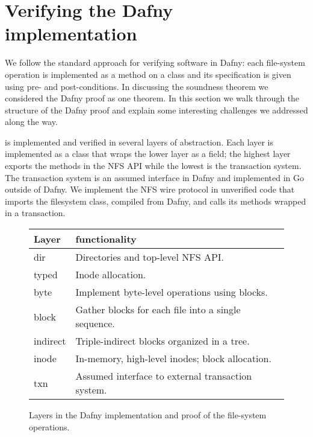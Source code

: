 \section{Verifying the Dafny implementation}%
\label{sec:design}

We follow the standard approach for verifying software in Dafny: each
file-system operation is implemented as a method on a class and its
specification is given using pre- and post-conditions. In discussing the
soundness theorem we considered the Dafny proof as one theorem. In this
section we walk through the structure of the Dafny proof and explain some interesting
challenges we addressed along the way.


\sys is implemented and verified in several layers of abstraction. Each layer is
implemented as a class that wraps the lower layer as a field; the highest layer
exports the methods in the NFS API while the lowest is the transaction system.
The transaction system is an assumed interface in Dafny and implemented in Go
outside of Dafny. We implement the NFS wire protocol in unverified code that
imports the filesystem class, compiled from Dafny, and calls its methods wrapped
in a transaction.


\begin{figure}
  \centering
\begin{tabular}{ll}
  \toprule
  \textbf{Layer} & \textbf{functionality} \\
  \midrule
  dir & Directories and top-level NFS API. \\
  typed & Inode allocation. \\
  byte & Implement byte-level operations using blocks. \\
  block & Gather blocks for each file into a single sequence. \\
  indirect & Triple-indirect blocks organized in a tree. \\
  inode & In-memory, high-level inodes; block allocation. \\
  txn & Assumed interface to external transaction system. \\
  \bottomrule
\end{tabular}
\caption{Layers in the Dafny implementation and proof of the file-system
operations.}
\label{fig:dafny-layers}
\end{figure}

